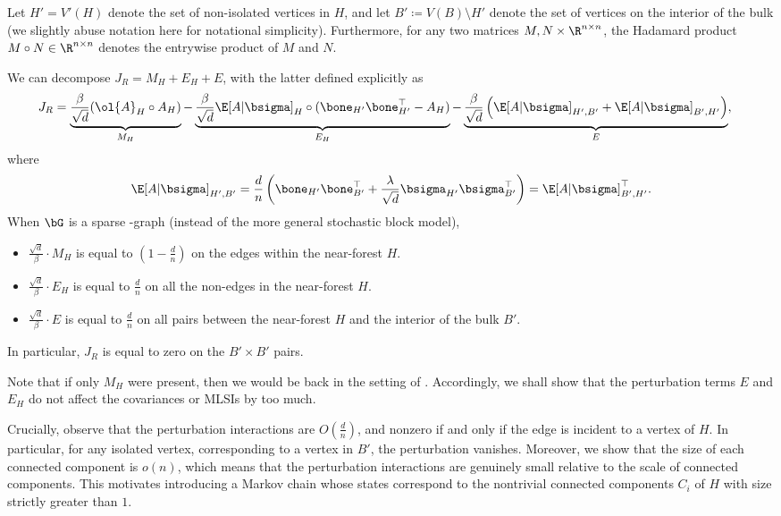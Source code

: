 \documentclass[11pt,letterpaper]{article}
\begin{document}
Let $H' = V'(H)$ denote the set of non-isolated vertices in $H$, and let $B' \coloneqq V(B) \setminus H'$ denote the set of vertices on the interior of the bulk (we slightly abuse notation here for notational simplicity).
Furthermore, for any two matrices $M, N \times \R^{n \times n}$, the Hadamard product $M \circ N \in \R^{n \times n}$ denotes the entrywise product of $M$ and $N$. 

We can decompose $J_R = M_H + E_H + E$, with the latter defined explicitly as 
\begin{align}
    J_R &= \underbrace{\frac{\beta}{\sqrt{d}}(\ol{A}_{H} \circ A_H)}_{M_{H}} - \underbrace{\frac{\beta}{\sqrt{d}}\E[A|\bsigma]_{H} \circ (\bone_{H'} \bone_{H'}^\top - A_H)}_{E_H} - \underbrace{\frac{\beta}{\sqrt{d}} \left(\E[A|\bsigma]_{H', B'} + \E[A|\bsigma]_{B', H'}\right) }_{E} \label{eq:new-Jb},
\end{align}
where
\[ \E[A|\bsigma]_{H', B'} = \frac{d}{n}\left(\bone_{H'} \bone_{B'}^\top + \frac{\lambda}{\sqrt{d}}\bsigma_{H'}\bsigma_{B'}^\top\right) = \E[A|\bsigma]_{B', H'}^\top. \]
When $\bG$ is a sparse \erdos-\renyi graph (instead of the more general stochastic block model),
\begin{itemize}
    \item $\frac{\sqrt{d}}{\beta} \cdot M_H$ is equal to $\left( 1 - \frac{d}{n} \right)$ on the edges within the near-forest $H$.
    \item $\frac{\sqrt{d}}{\beta} \cdot E_H$ is equal to $\frac{d}{n}$ on all the non-edges in the near-forest $H$.
    \item $\frac{\sqrt{d}}{\beta} \cdot E$ is equal to $\frac{d}{n}$ on all pairs between the near-forest $H$ and the interior of the bulk $B'$.
\end{itemize}
In particular, $J_R$ is equal to zero on the $B' \times B'$ pairs.
 
Note that if only $M_H$ were present, then we would be back in the setting of .
Accordingly, we shall show that the perturbation terms $E$ and $E_H$ do not affect the covariances or MLSIs by too much.

Crucially, observe that the perturbation interactions are $O\left(\frac{d}{n}\right)$, and nonzero if and only if the edge is incident to a vertex of $H$. 
In particular, for any isolated vertex, corresponding to a vertex in $B'$, the perturbation vanishes. 
Moreover, we show that the size of each connected component is $o(n)$, which means that the perturbation interactions are genuinely small relative to the scale of connected components. 
This motivates introducing a Markov chain whose states correspond to the nontrivial connected components $C_i$ of $H$ with size strictly greater than $1$.
\end{document}
